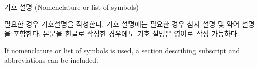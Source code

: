 \documentclass[11pt]{report}
\numberwithin{figure}{section}
\theoremstyle{plain}
\theoremstyle{definition}
\theoremstyle{corollary}
\theoremstyle{definition}
\theoremstyle{plain}
\theoremstyle{definition}
\theoremstyle{plain}
\begin{document}
\renewcommand{\contentsname}{목차 (Table of Contents)}
\tableofcontents

\renewcommand{\listtablename}{표 목차 (List of Tables)}
\listoftables

\renewcommand{\listfigurename}{그림 목차 (List of Figures)}
\listoffigures

\newpage
\begin{center}
\large
기호 설명 (Nomenclature or list of symbols)
\end{center}
\normalsize
필요한 경우 기호설명을 작성한다.
기호 설명에는 필요한 경우 첨자 설명 및 약어 설명을 포함한다.
본문을 한글로 작성한 경우에도 기호 설명은 영어로 작성 가능하다.

If nomenclature or list of symbols is used, a section describing subscript and abbreviations can be included. 
\end{document}
